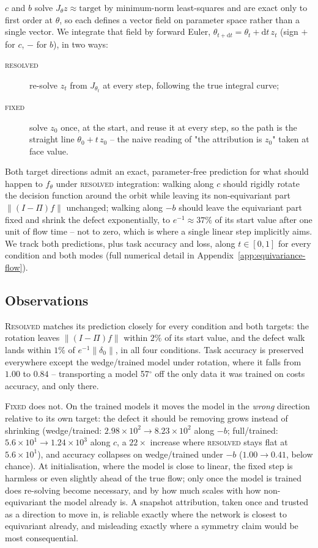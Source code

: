 $c$ and $b$ solve $J_\theta z\approx\text{target}$ by minimum-norm
least-squares and are exact only to first order at $\theta$, so each defines
a vector field on parameter space rather than a single vector. We integrate
that field by forward Euler, $\theta_{t+\mathrm{d}t}=\theta_t+\mathrm{d}t\,z_t$
(sign $+$ for $c$, $-$ for $b$), in two ways:
\begin{description}
  \item[\textsc{resolved}] re-solve $z_t$ from $J_{\theta_t}$ at every step,
    following the true integral curve;
  \item[\textsc{fixed}] solve $z_0$ once, at the start, and reuse it at every
    step, so the path is the straight line $\theta_0+t\,z_0$ -- the naive
    reading of "the attribution is $z_0$" taken at face value.
\end{description}
Both target directions admit an exact, parameter-free prediction for what
should happen to $f_\theta$ under \textsc{resolved} integration: walking along
$c$ should rigidly rotate the decision function around the orbit while
leaving its non-equivariant part $\lVert(I-\Pi)f\rVert$ unchanged; walking
along $-b$ should leave the equivariant part fixed and shrink the defect
exponentially, to $e^{-1}\approx37\%$ of its start value after one unit of
flow time -- not to zero, which is where a single linear step implicitly
aims. We track both predictions, plus task accuracy and loss, along $t\in[0,1]$
for every condition and both modes (full numerical detail in
Appendix~\ref{app:equivariance-flow}).

\subsection{Observations}
\label{sec:equivariance-flow-observations}

\textsc{Resolved} matches its prediction closely for every condition and both
targets: the rotation leaves $\lVert(I-\Pi)f\rVert$ within $2\%$ of its start
value, and the defect walk lands within $1\%$ of $e^{-1}\lVert\delta_0\rVert$,
in all four conditions. Task accuracy is preserved everywhere except the
wedge/trained model under rotation, where it falls from $1.00$ to $0.84$ --
transporting a model 57$^\circ$ off the only data it was trained on costs
accuracy, and only there.

\textsc{Fixed} does not. On the trained models it moves the model in the
\emph{wrong} direction relative to its own target: the defect it should be
removing grows instead of shrinking (wedge/trained: $2.98\times10^2\to
8.23\times10^2$ along $-b$; full/trained: $5.6\times10^1\to1.24\times10^3$
along $c$, a $22\times$ increase where \textsc{resolved} stays flat at
$5.6\times10^1$), and accuracy collapses on wedge/trained under $-b$
($1.00\to0.41$, below chance). At initialisation, where the model is close to
linear, the fixed step is harmless or even slightly ahead of the true flow;
only once the model is trained does re-solving become necessary, and by how
much scales with how non-equivariant the model already is. A snapshot
attribution, taken once and trusted as a direction to move in, is reliable
exactly where the network is closest to equivariant already, and misleading
exactly where a symmetry claim would be most consequential.

